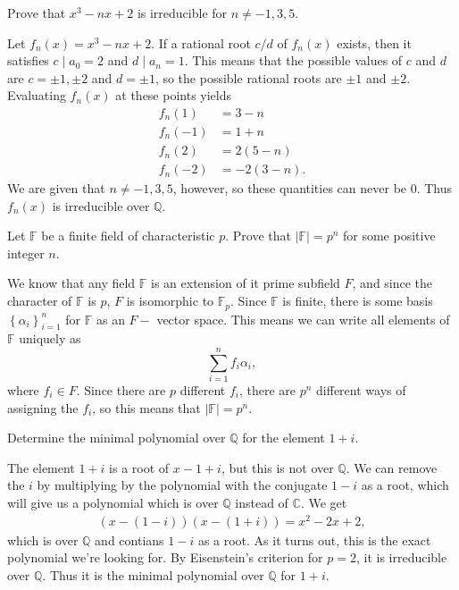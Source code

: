\documentclass[10pt]{report}
\begin{document}
\begin{exer}[DF 13.1: 7]
Prove that $x^3-nx+2$ is irreducible for $n \neq -1,3,5$.
\end{exer}
Let $f_n(x) = x^3-nx+2$. If a rational root $c/d$ of $f_n(x)$ exists, then it satisfies $c \;|\; a_0=2$ and $d\;|\;a_n=1$. This means that the possible values of $c$ and $d$ are $c = \pm 1, \pm 2$ and $d=\pm 1$, so the possible rational roots are $\pm 1$ and $\pm 2$. Evaluating $f_n(x)$ at these points yields
\begin{align*}
	f_n(1) &= 3-n \\
	f_n(-1) &= 1+n \\
	f_n(2)&=2(5-n) \\
	f_n(-2)&=-2(3-n).
\end{align*}
We are given that $n\neq -1,3,5$, however, so these quantities can never be 0. Thus $f_n(x)$ is irreducible over $\mathbb{Q}$.

\begin{exer}[DF 13.2: 1]
	Let $\mathbb{F}$ be a finite field of characteristic $p$. Prove that $|\mathbb{F}|=p^n$ for some positive integer $n$.
\end{exer}
We know that any field $\mathbb{F}$ is an extension of it prime subfield $F$, and since the character of $\mathbb{F}$ is $p$, $F$ is isomorphic to $\mathbb{F}_p$. Since $\mathbb{F}$ is finite, there is some basis $\left\{ \alpha_i \right\}_{i=1}^n$ for $\mathbb{F}$ as an $F-$ vector space. This means we can write all elements of $\mathbb{F}$ uniquely as
\[
\sum_{i=1}^{n} f_i \alpha_i,
\] where $f_i \in F$. Since there are $p$ different $f_i$, there are $p^n$ different ways of assigning the $f_i$, so this means that  $|\mathbb{F}|=p^n$.

\begin{exer}[DF 13.2: 3]
Determine the minimal polynomial over $\mathbb{Q}$ for the element $1+i$.
\end{exer}
The element $1+i$ is a root of $x-1+i$, but this is not over $\mathbb{Q}$. We can remove the $i$ by multiplying by the polynomial with the conjugate $1-i$ as a root, which will give us a polynomial which is over $\mathbb{Q}$ instead of $\mathbb{C}$. We get
\begin{align*}
	(x-(1-i)) (x-(1+i)) = x^2-2x+2,
\end{align*}
which is over $\mathbb{Q}$ and contians $1-i$ as a root. As it turns out, this is the exact polynomial we're looking for. By Eisenstein's criterion for $p=2$, it is irreducible over $\mathbb{Q}$. Thus it is the minimal polynomial over $\mathbb{Q}$ for $1+i$.
\end{document}
